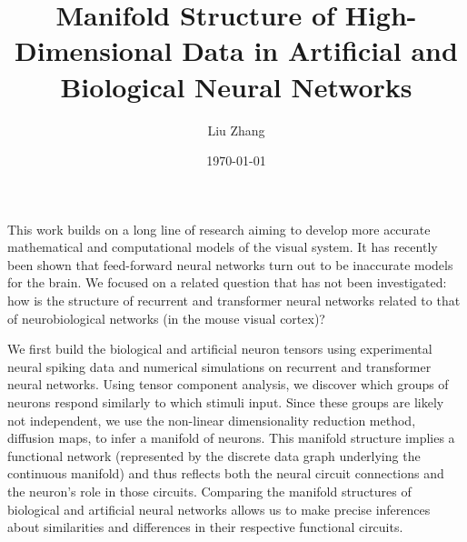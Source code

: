 \documentclass{article}
\title{Manifold Structure of High-Dimensional Data in Artificial and Biological Neural Networks}
\author{Liu Zhang}
\date{\today}
\begin{document}
\maketitle
This work builds on a long line of research aiming to develop more accurate mathematical and computational models of the visual system. It has recently been shown that feed-forward neural networks turn out to be inaccurate models for the brain. We focused on a related question that has not been investigated: how is the structure of recurrent and transformer neural networks related to that of neurobiological networks (in the mouse visual cortex)?

We first build the biological and artificial neuron tensors using experimental neural spiking data and numerical simulations on recurrent and transformer neural networks. Using tensor component analysis, we discover which groups of neurons respond similarly to which stimuli input. Since these groups are likely not independent, we use the non-linear dimensionality reduction method, diffusion maps, to infer a manifold of neurons. This manifold structure implies a functional network (represented by the discrete data graph underlying the continuous manifold) and thus reflects both the neural circuit connections and the neuron’s role in those circuits. Comparing the manifold structures of biological and artificial neural networks allows us to make precise inferences about similarities and differences in their respective functional circuits. 
\end{document}
